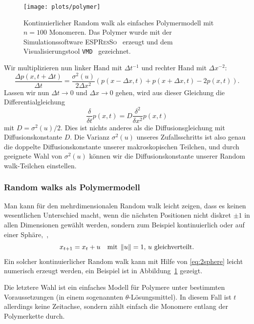 \begin{figure}
  \centering
  \texttt{[image: plots/polymer]}
  \caption{Kontinuierlicher Random walk als einfaches Polymermodell mit
    $n=100$ Monomeren. Das Polymer wurde mit der Simulationssoftware
    \textsc{ESPResSo}~\cite{espresso} erzeugt und dem
    Visualisierungstool \texttt{VMD}~\cite{vmd} gezeichnet.}
  \label{fig:contrw}
\end{figure}

Wir multiplizieren nun linker Hand mit $\Delta t^{-1}$ und rechter Hand mit
$\Delta x^{-2}$:
\begin{equation}
  \frac{\Delta p(x, t + \Delta t)}{\Delta t} =
  \frac{\sigma^2(u)}{2\Delta x^2} \left(p(x - \Delta x, t) +
    p(x + \Delta x, t) - 2 p(x, t)\right).
\end{equation}
Lassen wir nun $\Delta t\to 0$ und $\Delta x\to 0$ gehen, wird aus
dieser Gleichung die Differentialgleichung
\begin{equation}
  \frac{\delta}{\delta t} p(x, t) =
  D\frac{\delta^2}{\delta x^2} p(x, t)
\end{equation}
mit $D=\sigma^2(u)/2$.  Dies ist nichts anderes als die
Diffusionsgleichung mit Diffusionskonstante $D$. Die Varianz
$\sigma^2(u)$ unseres Zufallsschritts ist also genau die doppelte
Diffusionskonstante unserer makroskopischen Teilchen, und durch
geeignete Wahl von $\sigma^2(u)$ können wir die Diffusionskonstante
unserer Random walk-Teilchen einstellen.

\subsubsection{Random walks als Polymermodell}

Man kann für den mehrdimensionalen Random walk leicht zeigen, dass es
keinen wesentlichen Unterschied macht, wenn die nächsten Positionen
nicht diskret $\pm 1$ in allen Dimensionen gewählt werden, sondern zum
Beispiel kontinuierlich oder auf einer Sphäre, \dh\,,
\begin{equation}
  x_{t+1} = x_t + u \quad\text{mit}\; \left\lVert{u}\right\rVert=1,\,u\text{ gleichverteilt}.
\end{equation}
Ein solcher kontinuierlicher Random walk kann mit Hilfe von
\eqref{eq:2sphere} leicht numerisch erzeugt werden, ein Beispiel ist
in Abbildung~\ref{fig:contrw} gezeigt.

Die letztere Wahl ist ein einfaches Modell für Polymere unter
bestimmten Voraussetzungen (in einem sogenannten
$\theta$-Lösungsmittel).  In diesem Fall ist $t$ allerdings keine
Zeitachse, sondern zählt einfach die Monomere entlang der Polymerkette
durch.

